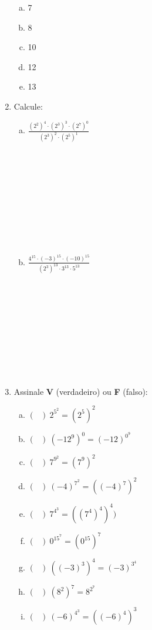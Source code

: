 \documentclass[a4paper,14pt]{article}
\begin{document}
\begin{multicols}{2}
\begin{enumerate}
    		\begin{enumerate}[a)]
    			\item 7
    			\item 8
    			\item 10
    			\item 12
    			\item 13 \newpage
    		\end{enumerate}
    		\item Calcule:
    		\begin{enumerate}[a)]
    			\item $\frac{(2^2)^4 \cdot (2^3)^3 \cdot (2^7)^0}{(2^3)^2 \cdot (2^5)^1}$ \\\\\\\\\\\\\\\\\\\\
    			\item $\frac{4^{15} \cdot (-3)^{15} \cdot (-10)^{15}}{(2^3)^{13} \cdot 3^{13} \cdot 5^{13}}$ \\\\\\\\\\\\\\\\\\\\
    		\end{enumerate}
    		\item Assinale \textbf{V} (verdadeiro) ou \textbf{F} (falso):
    		\begin{enumerate}[a)]
    			\item $(~~~)~2^{5^2} = (2^5)^2$
    			\item $(~~~)~(-12^9)^0 = (-12)^{0^9}$
    			\item $(~~~)~7^{9^2} = (7^9)^2$
    			\item $(~~~)~(-4)^{7^2} = ((-4)^7)^2$
    			\item $(~~~)~7^{4^3} = ((7^4)^4)^4)$
    			\item $(~~~)~0^{15^7} = (0^{15})^7$
    			\item $(~~~)~((-3)^3)^4 = (-3)^{3^4}$
    			\item $(~~~)~(8^2)^7 = 8^{2^7}$
    			\item $(~~~)~(-6)^{4^3} = ((-6)^4)^3$

\end{enumerate}
\end{enumerate}
\end{multicols}
\end{document}

